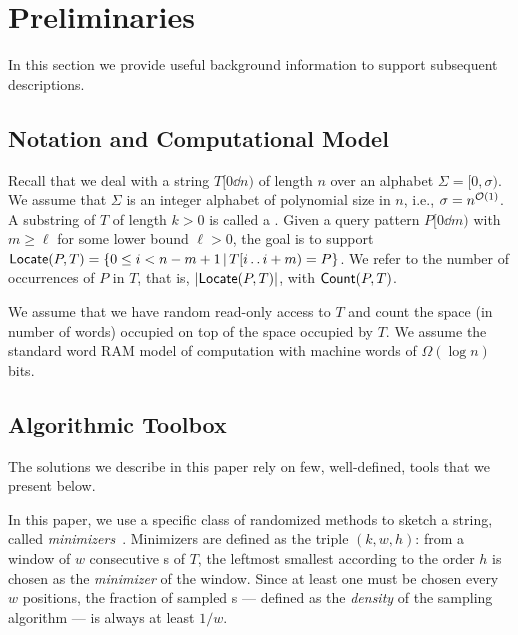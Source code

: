\clearpage
\section{Preliminaries}\label{sec:background}

In this section we provide useful background information to support subsequent descriptions.

\subsection{Notation and Computational Model}

Recall that we deal with a string $T[0 \dd n)$ of length $n$ over an alphabet $\Sigma=[0,\sigma)$.
We assume that $\Sigma$ is an integer alphabet of polynomial size in $n$, i.e., $\sigma=n^{\mathcal{O}(1)}$. 
A substring of $T$ of length $k>0$ is called a {\kmer}.
Given a query pattern $P[0 \dd m)$ with $m \geq \ell$ for some lower bound $\ell > 0$, the goal is to support
$\textup{\textsf{Locate}}(P,T) = \{0 \leq i < n-m+1 \, | \, T[i \mathinner{.\,.} i+m) = P \}$.
We refer to the number of occurrences of $P$ in $T$, that is, $|\textup{\textsf{Locate}}(P,T)|$, with $\textup{\textsf{Count}}(P,T)$. 


We assume that we have random read-only access to $T$ and
count the space (in number of words) occupied on top of the space occupied by $T$. We assume the standard word RAM model of computation with machine words of $\Omega(\log n)$ bits.

\subsection{Algorithmic Toolbox}

The solutions we describe in this paper rely on few, well-defined, tools that we present below.

In this paper, we use a specific class of randomized methods to sketch a string, called \textit{minimizers}~\cite{DBLP:journals/bioinformatics/RobertsHHMY04,DBLP:conf/sigmod/SchleimerWA03}. Minimizers are defined as the triple $(k,w,h)$: from a window of $w$ consecutive {\kmer}s of $T$, the leftmost smallest {\kmer} according to the order $h$ is chosen as the \textit{minimizer} of the window.
Since at least one {\kmer} must be chosen every $w$ positions, the fraction of sampled {\kmer}s --- defined as the \textit{density} of the sampling algorithm --- is always at least $1/w$.

